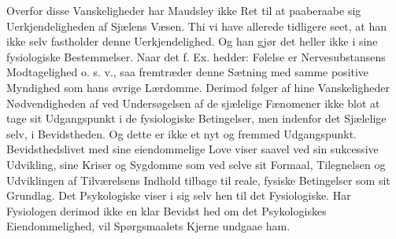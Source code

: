 \documentclass[12pt,a4paper,openany]{book}
\newcommand{\opage}[1]{\marginnote{\footnotesize\textit{[#1]}}}
\begin{document}
Overfor disse Vanskeligheder har Maudsley ikke Ret
til at paaberaabe sig Uerkjendeligheden af Sjælens Væsen.
Thi vi have allerede tidligere seet, at han ikke selv fastholder
denne Uerkjendelighed. Og han gjør det heller ikke i sine
fysiologiske Bestemmelser. Naar det f. Ex. hedder: Følelse
er Nervesubstansens Modtagelighed o. s. v., saa fremtræder
denne Sætning med samme positive Myndighed som hans
øvrige Lærdomme. Derimod følger af hine Vanskeligheder
Nødvendigheden af ved Undersøgelsen af de sjælelige Fænomener
ikke blot at tage sit Udgangspunkt i de fysiologiske
Betingelser, men indenfor det Sjælelige selv, i Bevidstheden.
Og dette er ikke et nyt og fremmed Udgangspunkt. Bevidsthedslivet
med sine eiendommelige Love viser saavel ved
sin sukcessive Udvikling, sine Kriser og Sygdomme som ved
selve sit Formaal, Tilegnelsen og Udviklingen af Tilværelsens
Indhold tilbage til reale, fysiske Betingelser som sit
Grundlag. Det Psykologiske viser i sig selv hen til det
Fysiologiske. Har Fysiologen derimod ikke en klar Bevidst%
\opage{319}hed om det Psykologiskes Eiendommelighed, vil Spørgsmaalets
Kjerne undgaae ham.
\end{document}
